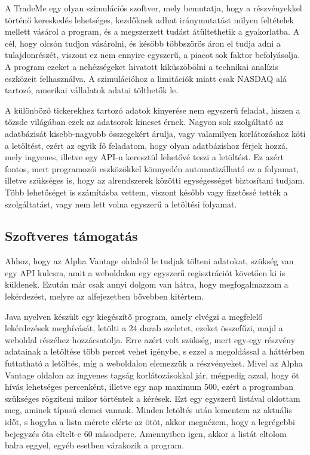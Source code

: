 A TradeMe egy olyan szimulációs szoftver, mely bemutatja, hogy a részvényekkel történő kereskedés lehetséges, kezdőknek adhat iránymutatást milyen feltételek mellett vásárol a program, és a megszerzett tudást átültethetik a gyakorlatba. A cél, hogy olcsón tudjon vásárolni, és később többszörös áron el tudja adni a tulajdonrészét, viszont ez nem ennyire egyszerű, a piacot sok faktor befolyásolja. A program ezeket a nehézségeket hivatott kiküszöbölni a technikai analízis eszközeit felhasználva. A szimulációhoz a limitációk miatt csak NASDAQ alá tartozó, amerikai vállalatok adatai tölthetők le.

A különböző tickerekhez tartozó adatok kinyerése nem egyszerű feladat, hiszen a tőzsde világában ezek az adatsorok kincset érnek. Nagyon sok szolgáltató az adatbázisát kisebb-nagyobb összegekért árulja, vagy valamilyen korlátozáshoz köti a letöltést, ezért az egyik fő feladatom, hogy olyan adatbázishoz férjek hozzá, mely ingyenes, illetve egy API-n keresztül lehetővé teszi a letöltést. Ez azért fontos, mert programozói eszközökkel könnyedén automatizálható ez a folyamat, illetve szükséges is, hogy az alrendszerek közötti egységességet biztosítani tudjam. Több lehetőséget is számításba vettem, viszont később vagy fizetőssé tették a szolgáltatást, vagy nem lett volna egyszerű a letöltési folyamat.

\subsection{Szoftveres támogatás}

Ahhoz, hogy az Alpha Vantage oldalról le tudjak tölteni adatokat, szükség van egy API kulcsra, amit a weboldalon egy egyszerű regisztrációt követően ki is küldenek. Ezután már csak annyi dolgom van hátra, hogy megfogalmazzam a lekérdezést, melyre az  alfejezetben bővebben kitértem.

Java nyelven készült egy kiegészítő program, amely elvégzi a megfelelő lekérdezések meghívását, letölti a 24 darab szeletet, ezeket összefűzi, majd a weboldal részéhez hozzácsatolja. Erre azért volt szükség, mert egy-egy részvény adatainak a letöltése több percet vehet igénybe, s ezzel a megoldással a háttérben futtatható a letöltés, míg a weboldalon elemezzük a részvényeket. Mivel az Alpha Vantage oldalon az ingyenes tagság korlátozásokkal jár, mégpedig azzal, hogy öt hívás lehetséges percenként, illetve egy nap maximum 500, ezért a programban szükséges rögzíteni mikor történtek a kérések. Ezt egy egyszerű listával oldottam meg, aminek  típusú elemei vannak. Minden letöltés után lementem az aktuális időt, s hogyha a lista mérete elérte az ötöt, akkor megnézem, hogy a legrégebbi bejegyzés óta eltelt-e 60 másodperc. Amennyiben igen, akkor a listát eltolom balra eggyel, egyéb esetben várakozik a program.

